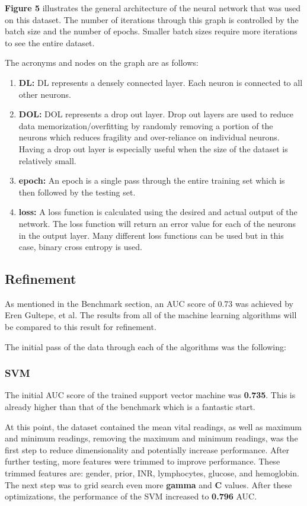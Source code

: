 \documentclass[11pt]{article}
\begin{document}
	\textbf{Figure 5} illustrates the general architecture of the neural network that was used on this dataset. The number of iterations through this graph is controlled by the batch size and the number of epochs. Smaller batch sizes require more iterations to see the entire dataset.
	
	The acronyms and nodes on the graph are as follows:
	\begin{enumerate}
		\item \textbf{DL:} DL represents a densely connected layer. Each neuron is connected to all other neurons.
		\item \textbf{DOL:} DOL represents a drop out layer. Drop out layers are used to reduce data memorization/overfitting by randomly removing a portion of the neurons which reduces fragility and over-reliance on individual neurons. Having a drop out layer is especially useful when the size of the dataset is relatively small.
		\item \textbf{epoch:}  An epoch is a single pass through the entire training set which is then followed by the testing set.
		\item \textbf{loss:} A loss function is calculated using the desired and actual output of the network. The loss function will return an error value for each of the neurons in the output layer. Many different loss functions can be used but in this case, binary cross entropy is used.
	\end{enumerate}

	\subsection{Refinement}
	As mentioned in the Benchmark section, an AUC score of 0.73 was achieved by Eren Gultepe, et al. The results from all of the machine learning algorithms will be compared to this result for refinement.
	
	The initial pass of the data through each of the algorithms was the following:
	
	\subsubsection{SVM}
    The initial AUC score of the trained support vector machine was \textbf{0.735}. This is already higher than that of the benchmark which is a fantastic start.

	At this point, the dataset contained the mean vital readings, as well as maximum and minimum readings, removing the maximum and minimum readings, was the first step to reduce dimensionality and potentially increase performance. After further testing, more features were trimmed to improve performance. These trimmed features are: gender, prior, INR, lymphocytes, glucose, and hemoglobin. The next step was to grid search even more \textbf{gamma} and \textbf{C} values. After these optimizations, the performance of the SVM increased to \textbf{0.796} AUC.
	
\end{document}
